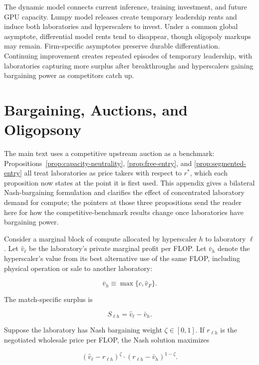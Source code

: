 \documentclass[11pt]{article}
\begin{document}
The dynamic model connects current inference, training investment, and future GPU capacity. Lumpy model releases create temporary leadership rents and induce both laboratories and hyperscalers to invest. Under a common global asymptote, differential model rents tend to disappear, though oligopoly markups may remain. Firm-specific asymptotes preserve durable differentiation. Continuing improvement creates repeated episodes of temporary leadership, with laboratories capturing more surplus after breakthroughs and hyperscalers gaining bargaining power as competitors catch up.

\appendix

\section{Bargaining, Auctions, and Oligopsony}
\label{app:bargaining}

The main text uses a competitive upstream auction as a benchmark: Propositions~\ref{prop:capacity-neutrality}, \ref{prop:free-entry}, and \ref{prop:segmented-entry} all treat laboratories as price takers with respect to $r^*$, which each proposition now states at the point it is first used. This appendix gives a bilateral Nash-bargaining formulation and clarifies the effect of concentrated laboratory demand for compute; the pointers at those three propositions send the reader here for how the competitive-benchmark results change once laboratories have bargaining power.

Consider a marginal block of compute allocated by hyperscaler $h$ to laboratory $\ell$. Let $\widehat v_\ell$ be the laboratory's private marginal profit per FLOP. Let $\bar v_h$ denote the hyperscaler's value from its best alternative use of the same FLOP, including physical operation or sale to another laboratory:

\begin{equation}\bar v_h\equiv\max\{c,\widehat v_F\}.\end{equation}

The match-specific surplus is

\begin{equation}S_{\ell h}=\widehat v_\ell-\bar v_h.\end{equation}

Suppose the laboratory has Nash bargaining weight $\zeta\in[0,1]$. If $r_{\ell h}$ is the negotiated wholesale price per FLOP, the Nash solution maximizes

\begin{equation}\left(\widehat v_\ell-r_{\ell h}\right)^\zeta\cdot\left(r_{\ell h}-\bar v_h\right)^{1-\zeta}.\end{equation}
\end{document}
